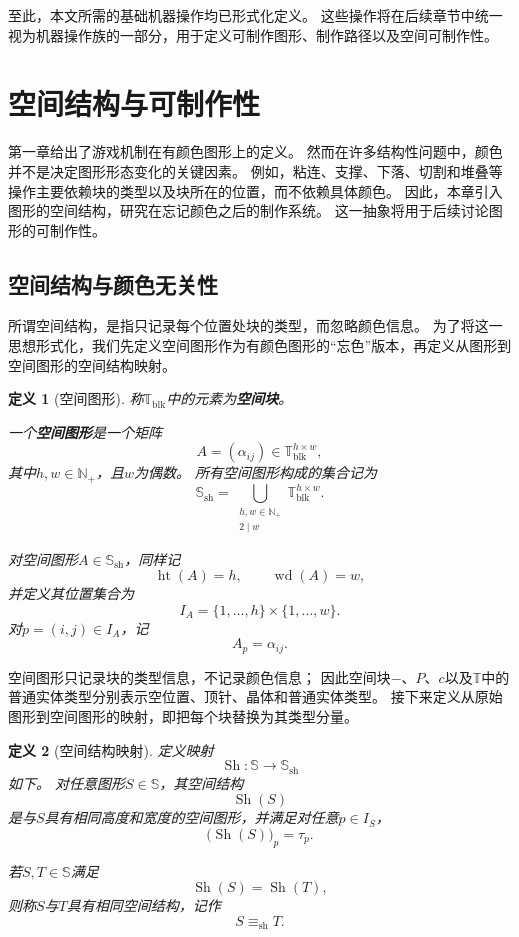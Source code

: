 \documentclass[UTF8,fontset=none]{ctexart}
\theoremstyle{cnthm}
\newtheorem{definition}{定义}[section]
\begin{document}
			至此，本文所需的基础机器操作均已形式化定义。
			这些操作将在后续章节中统一视为机器操作族的一部分，用于定义可制作图形、制作路径以及空间可制作性。
		
	\newpage
		
	\section{空间结构与可制作性}
		
		第一章给出了游戏机制在有颜色图形上的定义。
		然而在许多结构性问题中，颜色并不是决定图形形态变化的关键因素。
		例如，粘连、支撑、下落、切割和堆叠等操作主要依赖块的类型以及块所在的位置，而不依赖具体颜色。
		因此，本章引入图形的空间结构，研究在忘记颜色之后的制作系统。
		这一抽象将用于后续讨论图形的可制作性。
				
		\subsection{空间结构与颜色无关性}
		
			所谓空间结构，是指只记录每个位置处块的类型，而忽略颜色信息。
			为了将这一思想形式化，我们先定义空间图形作为有颜色图形的“忘色”版本，再定义从图形到空间图形的空间结构映射。
			
			\begin{definition}[空间图形]
				称$\mathbb{T}_{\mathrm{blk}}$中的元素为\textbf{空间块}。
				
				一个\textbf{空间图形}是一个矩阵
				$$
				A=(\alpha_{ij})\in \mathbb{T}_{\mathrm{blk}}^{h\times w},
				$$
				其中$h,w\in\mathbb{N}_{+}$，且$w$为偶数。
				所有空间图形构成的集合记为
				$$
				\mathbb{S}_{\mathrm{sh}}
				=
				\bigcup_{\substack{h,w\in\mathbb{N}_{+}\\2\mid w}}
				\mathbb{T}_{\mathrm{blk}}^{h\times w}.
				$$
				
				对空间图形$A\in\mathbb{S}_{\mathrm{sh}}$，同样记
				$$
				\operatorname{ht}(A)=h,\qquad
				\operatorname{wd}(A)=w,
				$$
				并定义其位置集合为
				$$
				I_A=\{1,\dots,h\}\times\{1,\dots,w\}.
				$$
				对$p=(i,j)\in I_A$，记
				$$
				A_p=\alpha_{ij}.
				$$
			\end{definition}
			
			空间图形只记录块的类型信息，不记录颜色信息；
			因此空间块$-$、$P$、$c$以及$\mathbb{T}$中的普通实体类型分别表示空位置、顶针、晶体和普通实体类型。
			接下来定义从原始图形到空间图形的映射，即把每个块替换为其类型分量。
			
			\begin{definition}[空间结构映射]
				定义映射
				$$
				\operatorname{Sh}:\mathbb{S}\to\mathbb{S}_{\mathrm{sh}}
				$$
				如下。
				对任意图形$S\in\mathbb{S}$，其空间结构
				$$
				\operatorname{Sh}(S)
				$$
				是与$S$具有相同高度和宽度的空间图形，并满足对任意$p\in I_S$，
				$$
				\bigl(\operatorname{Sh}(S)\bigr)_p=\tau_p.
				$$
				
				若$S,T\in\mathbb{S}$满足
				$$
				\operatorname{Sh}(S)=\operatorname{Sh}(T),
				$$
				则称$S$与$T$具有相同空间结构，记作
				$$
				S\equiv_{\mathrm{sh}}T.
				$$
			\end{definition}
			
\end{document}
